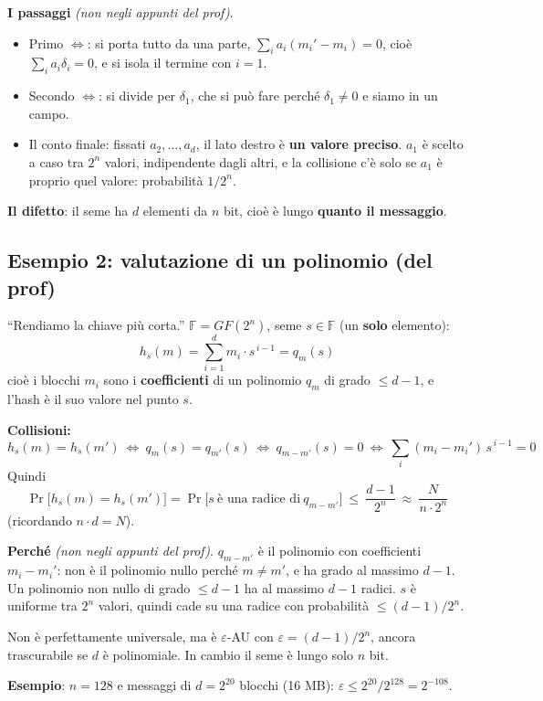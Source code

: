 \begin{nota}
\textbf{I passaggi} \emph{(non negli appunti del prof)}.
\begin{itemize}
  \item Primo \(\Leftrightarrow\): si porta tutto da una parte, \(\sum_i a_i (m_i' - m_i) = 0\), cioè \(\sum_i a_i \delta_i = 0\), e si isola il termine con \(i = 1\).
  \item Secondo \(\Leftrightarrow\): si divide per \(\delta_1\), che si può fare perché \(\delta_1 \ne 0\) e siamo in un campo.
  \item Il conto finale: fissati \(a_2, \dots, a_d\), il lato destro è \textbf{un valore preciso}. \(a_1\) è scelto a caso tra \(2^n\) valori, indipendente dagli altri, e la collisione c'è solo se \(a_1\) è proprio quel valore: probabilità \(1/2^n\).
\end{itemize}
\textbf{Il difetto}: il seme ha \(d\) elementi da \(n\) bit, cioè è lungo \textbf{quanto il messaggio}.
\end{nota}

\subsection{Esempio 2: valutazione di un polinomio (del prof)}

``Rendiamo la chiave più corta.'' \(\mathbb{F} = GF(2^n)\), seme \(s \in \mathbb{F}\) (un \textbf{solo} elemento):
\[
h_s(m) = \sum_{i=1}^{d} m_i \cdot s^{\,i-1} = q_m(s)
\]
cioè i blocchi \(m_i\) sono i \textbf{coefficienti} di un polinomio \(q_m\) di grado \(\le d - 1\), e l'hash è il suo valore nel punto \(s\).

\textbf{Collisioni:}
\[
h_s(m) = h_s(m') \ \Longleftrightarrow\ q_m(s) = q_{m'}(s) \ \Longleftrightarrow\ q_{m - m'}(s) = 0 \ \Longleftrightarrow\ \sum_i (m_i - m_i')\, s^{\,i-1} = 0
\]
Quindi
\[
\Pr\big[h_s(m) = h_s(m')\big] = \Pr\big[s \ \text{è una radice di}\ q_{m-m'}\big] \ \le\ \frac{d - 1}{2^n} \ \approx\ \frac{N}{n \cdot 2^n}
\]
(ricordando \(n \cdot d = N\)).

\begin{nota}
\textbf{Perché} \emph{(non negli appunti del prof)}. \(q_{m - m'}\) è il polinomio con coefficienti \(m_i - m_i'\): non è il polinomio nullo perché \(m \ne m'\), e ha grado al massimo \(d - 1\). Un polinomio non nullo di grado \(\le d - 1\) ha al massimo \(d - 1\) radici. \(s\) è uniforme tra \(2^n\) valori, quindi cade su una radice con probabilità \(\le (d-1)/2^n\).

Non è perfettamente universale, ma è \(\varepsilon\)-AU con \(\varepsilon = (d-1)/2^n\), ancora trascurabile se \(d\) è polinomiale. In cambio il seme è lungo solo \(n\) bit.

\textbf{Esempio}: \(n = 128\) e messaggi di \(d = 2^{20}\) blocchi (16 MB): \(\varepsilon \le 2^{20} / 2^{128} = 2^{-108}\).
\end{nota}

